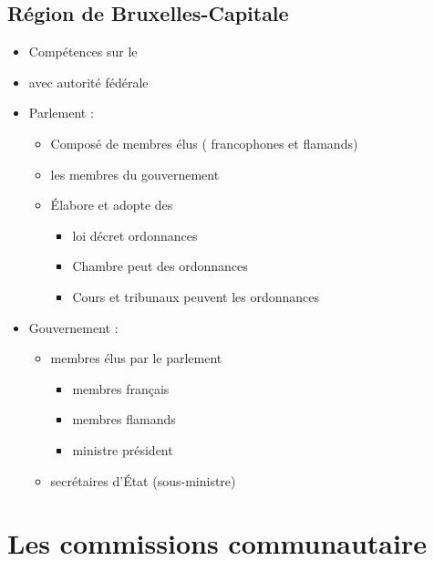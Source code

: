 \subsection{Région de Bruxelles-Capitale}
\begin{itemize}
	\item Compétences sur le 
	\item {} avec autorité fédérale
	\item Parlement :
	\begin{itemize}
		\item Composé de  membres élus ( francophones et  flamands)
		\item {} les membres du gouvernement
		\item Élabore et adopte des 
		\begin{itemize}
			\item loi \textred{=} décret \textred{$\simeq$} ordonnances
			\item Chambre peut  des ordonnances
			\item Cours et tribunaux peuvent  les ordonnances
 		\end{itemize}
	\end{itemize}
	\item Gouvernement :
	\begin{itemize}
		\item {} membres élus par le parlement
		\begin{itemize}
			\item {} membres français
			\item {} membres flamands
			\item {} ministre président
		\end{itemize}
		\item {} secrétaires d'État (sous-ministre)
	\end{itemize}
\end{itemize}

\section{Les commissions communautaire}
